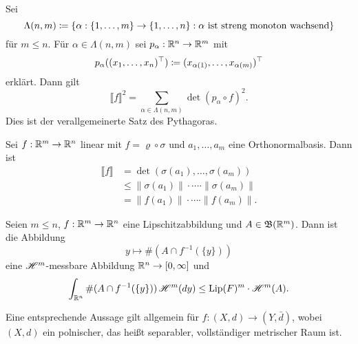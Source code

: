 \documentclass[a4paper,twoside,DIV15,BCOR12mm]{scrbook}
\newcommand{\borel}{\mathfrak B}
\newcommand{\HM}{\H}
\DeclareMathOperator{\Lip}{Lip}
\begin{document}
\begin{bemerkungen}
\item Sei
\[
\Lambda(n,m) \da \{\alpha:\{1,\ldots,m\} \to \{1,\ldots,n\} : \text{$\alpha$ ist streng monoton wachsend}\}
\]
für $m\le n$. Für $\alpha \in\Lambda(n,m)$ sei $p_\alpha: \mathbb{R}^n \to\mathbb{R}^m$ mit
\[
p_\alpha( (x_1,\ldots,x_n)^\top ) \da (x_{\alpha(1)},\ldots,x_{\alpha(m)})^\top
\]
erklärt. Dann gilt
\[
\llbracket f \rrbracket^2 = \sum_{\alpha\in \Lambda(n,m)}  \det(p_\alpha \circ f)^2.
\]
Dies ist der verallgemeinerte Satz des Pythagoras.
\item Sei $f:\mathbb{R}^m \to \mathbb{R}^n$ linear mit $f=\varrho\circ\sigma$ und $a_1,\ldots,a_m$ eine Orthonormalbasis. Dann ist
\begin{align*}
\llbracket f \rrbracket 
&= \det(\sigma(a_1),\ldots,\sigma(a_m)) \\
&\le \|\sigma(a_1)\|\cdot \cdots \cdot \|\sigma(a_m)\| \\
&= \|f(a_1)\|\cdot \cdots \cdot \|f(a_m)\|.
\end{align*}
\end{bemerkungen}

\begin{proposition}
\label{prop:3.5}
Seien $m\le n$, $f:\mathbb{R}^m\to\mathbb{R}^n$ eine Lipschitzabbildung und $A\in \borel(\MdR^m)$. Dann ist die Abbildung
\[
y\mapsto \#(A\cap f^{-1}(\{y\}))
\]
eine $\HM^m$-messbare Abbildung $\mathbb{R}^n\to [0,\infty]$ und
\[
\int_{\MdR^n} \#(A\cap f^{-1}(\{y\}))\, \HM^m(dy) \le \Lip(F)^m \cdot \HM^m(A).
\]
\end{proposition}

\begin{bemerkung}
Eine entsprechende Aussage gilt allgemein für $f:(X,d)\to (Y,\bar d)$, wobei $(X,d)$ ein polnischer, das heißt separabler, vollständiger metrischer Raum ist.
\end{bemerkung}
\end{document}
